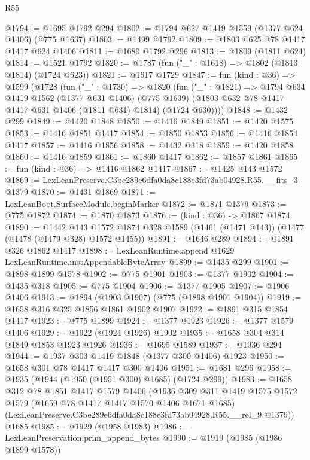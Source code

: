 \begin{lexlean}{R55}
\begin{coremodule}
{{@1794 := @1695 @1792 @294
@1802 := @1794 @627 @1419 @1559 (@1377 @624 @1406) (@775 @1637)
@1803 := @1499 @1792
@1809 := @1803 @625 @78 @1417 @1417 @624 @1406
@1811 := @1680 @1792 @296
@1813 := @1809 (@1811 @624)
@1814 := @1521 @1792
@1820 := @1787 (fun ("_" : @1618) => @1802 (@1813 @1814) (@1724 @623))
@1821 := @1617 @1729
@1847 := fun (kind : @36) =>
  @1599
    (@1728
      (fun ("_" : @1730) =>
      @1820
        (fun ("_" : @1821) =>
        @1794
          @634
          @1419
          @1562
          (@1377 @631 @1406)
          (@775 @1639)
          (@1803 @632 @78 @1417 @1417 @631 @1406 (@1811 @631) @1814)
          (@1724 @630))))
@1848 := @1432 @299
@1849 := @1420 @1848
@1850 := @1416 @1849
@1851 := @1420 @1575
@1853 := @1416 @1851 @1417
@1854 := @1850 @1853
@1856 := @1416 @1854 @1417
@1857 := @1416 @1856
@1858 := @1432 @318
@1859 := @1420 @1858
@1860 := @1416 @1859
@1861 := @1860 @1417
@1862 := @1857 @1861
@1865 := fun (kind : @36) => @1416 @1862 @1417
@1867 := @1425 @143 @1572
@1869 := LexLeanPreserve.C3be289e6dfa0da8c188e3fd73ab04928.R55.__fits_3 @1379
@1870 := @1431 @1869
@1871 := LexLeanBoot.SurfaceModule.beginMarker
@1872 := @1871 @1379
@1873 := @775 @1872
@1874 := @1870 @1873
@1876 := (kind : @36) -> @1867 @1874
@1890 := @1442
    @143
    @1572
    @1874
    @328
    @1589
    (@1461 (@1471 @143))
    (@1477 (@1478 (@1479 @328) @1572 @1455))
@1891 := @1646 @289
@1894 := @1891 @326 @1862 @1417
@1898 := LexLeanRuntime.append @1629 LexLeanRuntime.instAppendableByteArray
@1899 := @1435 @299
@1901 := @1898 @1899 @1578
@1902 := @775 @1901
@1903 := @1377 @1902
@1904 := @1435 @318
@1905 := @775 @1904
@1906 := @1377 @1905
@1907 := @1906 @1406
@1913 := @1894 (@1903 @1907) (@775 (@1898 @1901 @1904))
@1919 := @1658 @316 @325 @1856 @1861 @1902 @1907
@1922 := @1891 @315 @1854 @1417
@1923 := @775 @1899
@1924 := @1377 @1923
@1926 := @1377 @1579 @1406
@1929 := @1922 (@1924 @1926) @1902
@1935 := @1658 @304 @314 @1849 @1853 @1923 @1926
@1936 := @1695 @1589
@1937 := @1936 @294
@1944 := @1937 @303 @1419 @1848 (@1377 @300 @1406) @1923
@1950 := @1658 @301 @78 @1417 @1417 @300 @1406
@1951 := @1681 @296
@1958 := @1935 (@1944 (@1950 (@1951 @300) @1685) (@1724 @299))
@1983 := @1658
    @312
    @78
    @1851
    @1417
    @1579
    @1406
    (@1936
      @309
      @311
      @1419
      @1575
      @1572
      @1579
      (@1659 @78 @1417 @1417 @1570 @1406 @1671 @1685)
      (LexLeanPreserve.C3be289e6dfa0da8c188e3fd73ab04928.R55.__rel_9 @1379))
    @1685
@1985 := @1929 (@1958 @1983)
@1986 := LexLeanPreservation.prim_append_bytes
@1990 := @1919 (@1985 (@1986 @1899 @1578))
}}
\end{coremodule}
\end{lexlean}
